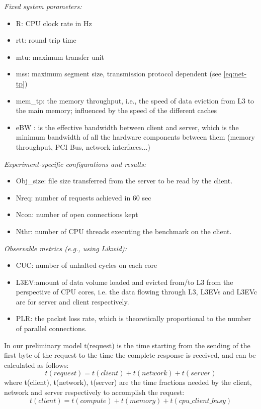 \documentclass[runningheads]{llncs}
\begin{document}
\textit{Fixed system parameters:}
\begin{itemize}
\item R: CPU clock rate in Hz
\item rtt: round trip time
\item mtu: maximum transfer unit
\item mss: maximum segment size, transmission protocol dependent (see \cref{eq:net-tp})
\item mem\_tp: the memory throughput, i.e., the speed of data eviction from L3 to the main memory; influenced by the speed of the different caches
\item eBW \cite{chang1995effective}: is the effective bandwidth between client and server, which is the minimum bandwidth of all the hardware components between them (memory throughput, PCI Bus, network interfaces...)
\end{itemize}

\textit{Experiment-specific configurations and results:}
\begin{itemize}
\item Obj\_size: file size transferred from the server to be read by the client.
\item Nreq: number of requests achieved in 60 sec
\item Ncon: number of open connections kept
\item Nthr: number of CPU threads executing the benchmark on the client.
\end{itemize}

\textit{Observable metrics (e.g., using Likwid):}
\begin{itemize}
\item CUC: number of unhalted cycles on each core %
\item L3EV:amount of data volume loaded and evicted from/to L3 from the perspective of CPU cores, i.e. the data flowing through L3\cite{l3explainedlik,intel-l3}, L3EVs and L3EVc are for server and client respectively.
\item PLR: the packet loss rate, which is theoretically proportional to the number of parallel connections. 
\end{itemize}

In our preliminary model t(request) is the time starting from the sending of the first byte of the request to the time the complete response is received, and can be calculated as follows:
\begin{equation}
t(request) = t(client) + t(network) + t(server)
\end{equation}
 where t(client), t(network), t(server) are the time fractions needed by the client, network and server respectively to accomplish the request:
\begin{equation}
t(client) = t(compute) + t(memory) + t(cpu\_client\_busy)
\end{equation}
\end{document}
